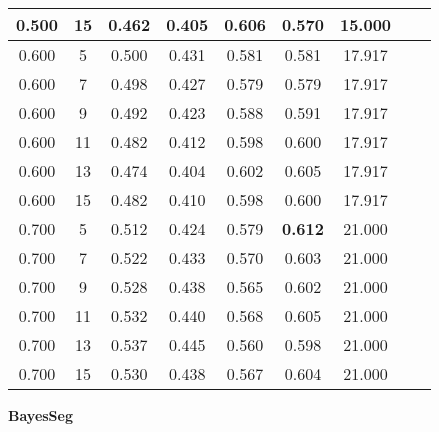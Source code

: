 \documentclass{article}
\begin{document}
\begin{longtable}[c]{|c|c|c|c|c|c|c|c|c|}
 0.500 & 15 & 0.462 & 0.405 & 0.606 & 0.570 & 15.000  \\ \hline 
 0.600 & 5 & 0.500 & 0.431 & 0.581 & 0.581 & 17.917  \\ \hline 
 0.600 & 7 & 0.498 & 0.427 & 0.579 & 0.579 & 17.917  \\ \hline 
 0.600 & 9 & 0.492 & 0.423 & 0.588 & 0.591 & 17.917  \\ \hline 
 0.600 & 11 & 0.482 & 0.412 & 0.598 & 0.600 & 17.917  \\ \hline 
 0.600 & 13 & 0.474 & 0.404 & 0.602 & 0.605 & 17.917  \\ \hline 
 0.600 & 15 & 0.482 & 0.410 & 0.598 & 0.600 & 17.917  \\ \hline 
 0.700 & 5 & 0.512 & 0.424 & 0.579 & \cellcolor{gray!20} \textbf{0.612} & 21.000  \\ \hline 
 0.700 & 7 & 0.522 & 0.433 & 0.570 & 0.603 & 21.000  \\ \hline 
 0.700 & 9 & 0.528 & 0.438 & 0.565 & 0.602 & 21.000  \\ \hline 
 0.700 & 11 & 0.532 & 0.440 & 0.568 & 0.605 & 21.000  \\ \hline 
 0.700 & 13 & 0.537 & 0.445 & 0.560 & 0.598 & 21.000  \\ \hline 
 0.700 & 15 & 0.530 & 0.438 & 0.567 & 0.604 & 21.000  \\ \hline 
 \end{longtable} 







 \newpage
{  
\large
\center
	\textbf{BayesSeg}  

}
\end{document}
